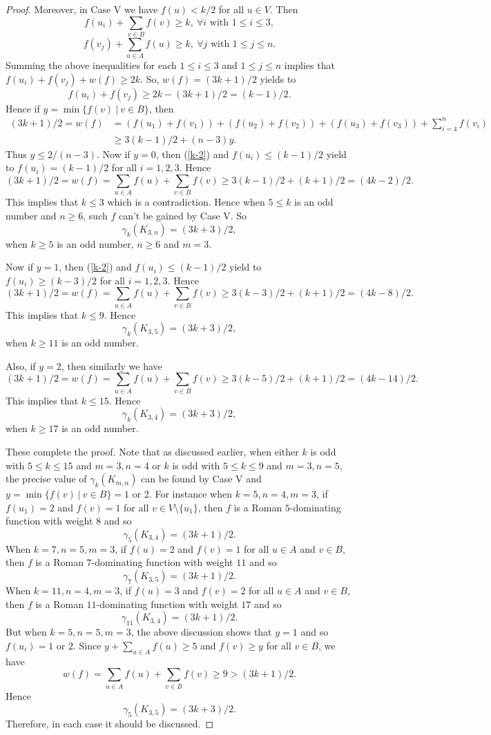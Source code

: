 \documentclass[10pt,a4paper]{amsart}
\begin{document}
\begin{proof}
Moreover, in Case V we have $f(u)<k/2$ for all $u\in V$. Then
$$f(u_i)+\sum_{v\in B}f(v)\geq k, \ \forall i \textrm{ with }  1\leq i \leq 3,$$
$$f(v_j)+\sum_{u\in A}f(u)\geq k,  \ \forall j \textrm{ with }  1\leq j \leq n.$$
Summing the above inequalities for each $1\leq i \leq 3$ and $1\leq j \leq n$ implies that $f(u_i)+f(v_j)+w(f)\geq 2k$. So, $w(f)=(3k+1)/2$ yields to
\begin{equation}\label{k-2}
f(u_i)+f(v_j)\geq 2k-(3k+1)/2=(k-1)/2. 
\end{equation}
Hence if $y=\min\{f(v) \ | \ v\in B\}$, then
\begin{align*}
(3k+1)/2=w(f)&=(f(u_1)+f(v_1))+(f(u_2)+f(v_2))+(f(u_3)+f(v_3))+\sum_{i=4}^nf(v_i)\\
&\geq 3(k-1)/2+(n-3)y.
\end{align*}
Thus $y\leq 2/(n-3)$. Now if $y=0$, then (\ref{k-2}) and $f(u_i)\leq (k-1)/2$ yield to $f(u_i)=(k-1)/2$ for all $i=1,2,3$. Hence
$$(3k+1)/2=w(f)=\sum_{u\in A}f(u)+\sum_{v\in B}f(v)\geq 3(k-1)/2+(k+1)/2=(4k-2)/2.$$
This implies that $k\leq 3$ which is a contradiction. Hence when $5\leq k$ is an odd number and $n\geq 6$, such $f$ can't be gained by Case V. So
$$\gamma_k(K_{3,n})=(3k+3)/2,$$
when $k\geq 5$ is an odd number, $n\geq 6$ and $m=3$.

Now if $y=1$, then (\ref{k-2}) and $f(u_i)\leq (k-1)/2$ yield to $f(u_i)\geq (k-3)/2$ for all $i=1,2,3$. Hence
$$(3k+1)/2=w(f)=\sum_{u\in A}f(u)+\sum_{v\in B}f(v)\geq 3(k-3)/2+(k+1)/2=(4k-8)/2.$$
This implies that $k\leq 9$. Hence 
$$\gamma_k(K_{3,5})=(3k+3)/2,$$
when $k\geq 11$ is an odd number.

Also, if $y=2$, then similarly we have 
$$(3k+1)/2=w(f)=\sum_{u\in A}f(u)+\sum_{v\in B}f(v)\geq 3(k-5)/2+(k+1)/2=(4k-14)/2.$$
This implies that $k\leq 15$. Hence 
$$\gamma_k(K_{3,4})=(3k+3)/2,$$
when $k\geq 17$ is an odd number.
 
 These complete the proof. Note that as discussed earlier, when either $k$ is odd with  $5\leq k \leq 15$ and $m=3, n=4$ or $k$ is odd with $5\leq k \leq 9$ and $m=3, n=5$, the precise value of $\gamma_k(K_{m,n})$ can be found by Case V and $y=\min\{f(v) \ | \ v\in B\}=1$ or $2$. For instance when $k=5, n=4, m=3$, if $f(u_1)=2$ and $f(v)=1$ for all $v\in V\setminus \{u_1\}$, then  $f$ is a Roman $5$-dominating function with weight $8$ and so 
$$\gamma_5(K_{3,4})=(3k+1)/2.$$
When $k=7, n=5, m=3$, if $f(u)=2$ and $f(v)=1$ for all $u\in A$ and $v\in B$, then  $f$ is a Roman $7$-dominating function with weight $11$ and so 
$$\gamma_7(K_{3,5})=(3k+1)/2.$$
When $k=11, n=4, m=3$, if $f(u)=3$ and $f(v)=2$ for all $u\in A$ and $v\in B$, then  $f$ is a Roman $11$-dominating function with weight $17$ and so 
$$\gamma_{11}(K_{3,4})=(3k+1)/2.$$
But when $k=5, n=5, m=3$, the above discussion shows that $y=1$ and so $f(u_i)=1$ or $2$. Since $y+\sum_{u\in A}f(u)\geq 5$ and $f(v)\geq y$ for all $v\in B$, we have
$$w(f)=\sum_{u\in A}f(u)+\sum_{v\in B}f(v)\geq 9>(3k+1)/2.$$
Hence
$$\gamma_5(K_{3,5})=(3k+3)/2.$$
Therefore, in each case it should be discussed.

\end{proof}
\end{document}
